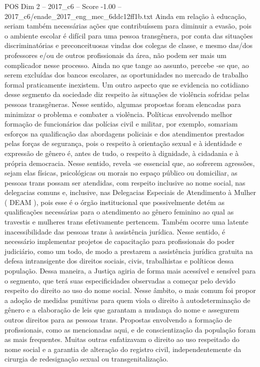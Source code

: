 \begin{textsample}{POS Dim 2 – 2017\_c6 – Score -1.00 – 2017\_c6/enade\_2017\_eng\_mec\_6ddc12ff1b.txt}
Ainda em relação à educação, seriam também necessárias ações que contribuíssem para diminuir a evasão, pois o ambiente escolar é difícil para uma pessoa transgênera, por conta das situações discriminatórias e preconceituosas vindas dos colegas de classe, e mesmo das/dos professores e/ou de outros profissionais da área, não podem ser mais um complicador nesse processo.
Ainda no que tange ao assunto, percebe -se que, ao serem excluídas dos bancos escolares, as oportunidades no mercado de trabalho formal praticamente inexistem.
Um outro aspecto que se evidencia no cotidiano desse segmento da sociedade diz respeito às situações de violência sofridas pelas pessoas transgêneras.
Nesse sentido, algumas propostas foram elencadas para minimizar o problema e combater a violência.
Políticas envolvendo melhor formação de funcionários das polícias civil e militar, por exemplo, somariam esforços na qualificação das abordagens policiais e dos atendimentos prestados pelas forças de segurança, pois o respeito à orientação sexual e à identidade e expressão de gênero é, antes de tudo, o respeito à dignidade, à cidadania e à própria democracia.
Nesse sentido, revela -se essencial que, ao sofrerem agressões, sejam elas físicas, psicológicas ou morais no espaço público ou domiciliar, as pessoas trans possam ser atendidas, com respeito inclusive ao nome social, nas delegacias comuns e, inclusive, nas Delegacias Especiais de Atendimento à Mulher ( DEAM ), pois esse é o órgão institucional que possivelmente detém as qualificações necessárias para o atendimento ao gênero feminino ao qual as travestis e mulheres trans efetivamente pertencem.
Também ocorre uma latente inacessibilidade das pessoas trans à assistência jurídica.
Nesse sentido, é necessário implementar projetos de capacitação para profissionais do poder judiciário, como um todo, de modo a prestarem a assistência jurídica gratuita na defesa intransigente dos direitos sociais, civis, trabalhistas e políticos dessa população.
Dessa maneira, a Justiça agiria de forma mais acessível e sensível para o segmento, que terá suas especificidades observadas a começar pelo devido respeito do direito ao uso do nome social.
Nesse âmbito, o mais comum foi propor a adoção de medidas punitivas para quem viola o direito à autodeterminação de gênero e a elaboração de leis que garantam a mudança do nome e assegurem outros direitos para as pessoas trans.
Propostas envolvendo a formação de profissionais, como as mencionadas aqui, e de conscientização da população foram as mais frequentes.
Muitas outras enfatizavam o direito ao uso respeitado do nome social e a garantia de alteração do registro civil, independentemente da cirurgia de redesignação sexual ou transgenitalização.

\end{textsample}
